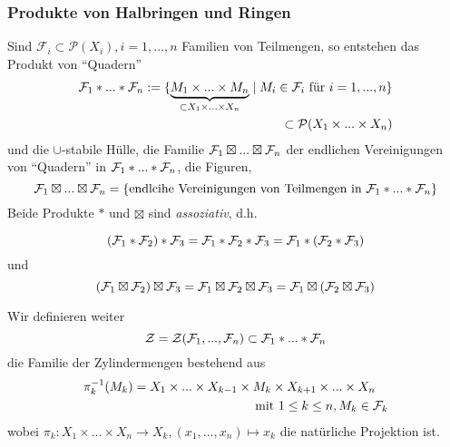 \subsubsection{Produkte von Halbringen und Ringen}
Sind $\mathcal{F}_i \subset \mathcal{P}(X_i), i=1,...,n$ Familien von Teilmengen, so entstehen das Produkt von ``Quadern''
\begin{equation*}
\begin{split}
\mathcal{F}_1 \ast ... \ast \mathcal{F}_n := \{ \underbrace{M_1 \times ... \times M_n}_{\subset X_1 \times ... \times X_n} \mid M_i \in \mathcal{F}_i \text{ für } i=1,...,n\}  \\ \subset  \mathcal{P}(X_1 \times ... \times X_n)
\end{split}
\end{equation*}
und die $\cup$-stabile Hülle, die Familie $\mathcal{F}_1 \boxtimes ... \boxtimes \mathcal{F}_n$ der endlichen Vereinigungen von ``Quadern'' in $\mathcal{F}_1 \ast ... \ast \mathcal{F}_n$, die Figuren, 
\begin{equation*}
\mathcal{F}_1 \boxtimes ... \boxtimes \mathcal{F}_n = \left\{\text{endlcihe Vereinigungen von Teilmengen in } \mathcal{F}_1 \ast ... \ast \mathcal{F}_n	\right\}
\end{equation*}
Beide Produkte $\ast$ und $\boxtimes$ sind \emph{assoziativ}, d.h.\begin{small}
\begin{equation*}
(\mathcal{F}_1 \ast \mathcal{F}_2) \ast \mathcal{F}_3 = \mathcal{F}_1 \ast \mathcal{F}_2 \ast \mathcal{F}_3 = \mathcal{F}_1 \ast (\mathcal{F}_2 \ast \mathcal{F}_3)
\end{equation*}
und
\begin{equation*}
(\mathcal{F}_1 \boxtimes \mathcal{F}_2) \boxtimes \mathcal{F}_3 = \mathcal{F}_1 \boxtimes \mathcal{F}_2 \boxtimes \mathcal{F}_3 = \mathcal{F}_1 \boxtimes (\mathcal{F}_2 \boxtimes \mathcal{F}_3)
\end{equation*}
\end{small}
Wir definieren weiter
\begin{equation*}
\mathcal{Z} = \mathcal{Z} (\mathcal{F}_1,...,\mathcal{F}_n) \subset \mathcal{F}_1 \ast ... \ast \mathcal{F}_n
\end{equation*}
die Familie der Zylindermengen bestehend aus
\begin{equation*}
\begin{split}
\pi_k^{-1}(M_k) = X_1 \times ... \times X_{k-1} \times M_k \times X_{k+1} \times ... \times X_n \quad\\ \text{mit } 1 \leq k \leq n, M_k \in \mathcal{F}_k
\end{split}
\end{equation*}
wobei $\pi_k: X_1 \times ... \times X_n \to X_k, (x_1,...,x_n) \mapsto x_k$ die natürliche Projektion ist. %
